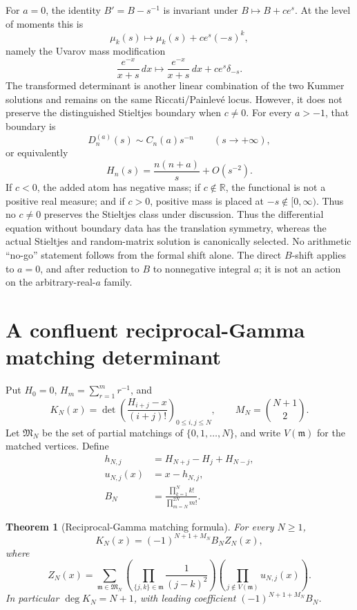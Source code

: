\documentclass[11pt]{article}
\newtheorem{theorem}{Theorem}[section]
\theoremstyle{definition}
\theoremstyle{remark}
\begin{document}
For \(a=0\), the identity \(B'=B-s^{-1}\) is invariant under
\(B\mapsto B+ce^s\).  At the level of moments this is
\begin{equation}
 \mu_k(s)\longmapsto\mu_k(s)+ce^s(-s)^k,
 \label{eq:Uvarov-shift}
\end{equation}
namely the Uvarov mass modification
\[
 \frac{e^{-x}}{x+s}\,dx
 \longmapsto
 \frac{e^{-x}}{x+s}\,dx+ce^s\delta_{-s}.
\]
The transformed determinant is another linear combination of the two Kummer
solutions and remains on the same Riccati/Painlev\'e locus.  However, it does
not preserve the distinguished Stieltjes boundary when \(c\neq0\).  For every
\(a>-1\), that boundary is
\begin{equation}
 D_n^{(a)}(s)\sim C_n(a)s^{-n}\qquad(s\to+\infty),
 \label{eq:recessive-boundary}
\end{equation}
or equivalently
\[
 H_n(s)=\frac{n(n+a)}s+O(s^{-2}).
\]
If \(c<0\), the added atom has negative mass; if \(c\notin\mathbb R\), the
functional is not a positive real measure; and if \(c>0\), positive mass is
placed at \(-s\notin[0,\infty)\).  Thus no \(c\neq0\) preserves the Stieltjes
class under discussion.
Thus the differential equation without boundary data has the translation
symmetry, whereas the actual Stieltjes and random-matrix solution is
canonically selected.  No arithmetic ``no-go'' statement follows from the
formal shift alone.  The direct \(B\)-shift applies to \(a=0\), and after
reduction to \(B\) to nonnegative integral \(a\); it is not an action on the
arbitrary-real-\(a\) family.

\section{A confluent reciprocal-Gamma matching determinant}
\label{sec:reciprocal-gamma-matching}

Put \(H_0=0\), \(H_m=\sum_{r=1}^m r^{-1}\), and
\[
 K_N(x)=\det\left(\frac{H_{i+j}-x}{(i+j)!}\right)_{0\leq i,j\leq N},
 \qquad
 M_N=\binom{N+1}{2}.
\]
Let \(\mathfrak M_N\) be the set of partial matchings of
\(\{0,1,\ldots,N\}\), and write \(V(\mathfrak m)\) for the matched vertices.
Define
\begin{align*}
 h_{N,j}&=H_{N+j}-H_j+H_{N-j},\\
 u_{N,j}(x)&=x-h_{N,j},\\
 B_N&=\frac{\prod_{k=1}^Nk!}{\prod_{m=N}^{2N}m!}.
\end{align*}

\begin{theorem}[Reciprocal-Gamma matching formula]
\label{thm:reciprocal-gamma-matching}
For every \(N\geq1\),
\begin{equation}
 \boxed{
 K_N(x)=(-1)^{N+1+M_N}B_N Z_N(x),}
 \label{eq:KN-matching-prefactor}
\end{equation}
where
\begin{equation}
 Z_N(x)=
 \sum_{\mathfrak m\in\mathfrak M_N}
 \left(\prod_{\{j,k\}\in\mathfrak m}\frac1{(j-k)^2}\right)
 \left(\prod_{j\notin V(\mathfrak m)}u_{N,j}(x)\right).
 \label{eq:ZN-matching}
\end{equation}
In particular \(\deg K_N=N+1\), with leading coefficient
\((-1)^{N+1+M_N}B_N\).
\end{theorem}
\end{document}
